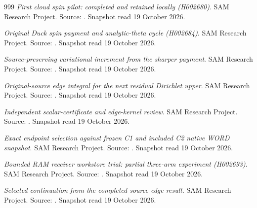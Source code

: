 \begin{thebibliography}{999}
 \emph{First cloud spin pilot: completed and retained locally (H002680)}. SAM Research Project. Source: . Snapshot read 19 October 2026.

 \emph{Original Duck spin payment and analytic-theta cycle (H002684)}. SAM Research Project. Source: . Snapshot read 19 October 2026.

 \emph{Source-preserving variational increment from the sharper payment}. SAM Research Project. Source: . Snapshot read 19 October 2026.

 \emph{Original-source edge integral for the next residual Dirichlet upper}. SAM Research Project. Source: . Snapshot read 19 October 2026.

 \emph{Independent scalar-certificate and edge-kernel review}. SAM Research Project. Source: . Snapshot read 19 October 2026.

 \emph{Exact endpoint selection against frozen C1 and included C2 native WORD snapshot}. SAM Research Project. Source: . Snapshot read 19 October 2026.

 \emph{Bounded RAM receiver workstore trial: partial three-arm experiment (H002693)}. SAM Research Project. Source: . Snapshot read 19 October 2026.

 \emph{Selected continuation from the completed source-edge result}. SAM Research Project. Source: . Snapshot read 19 October 2026.


\end{thebibliography}
